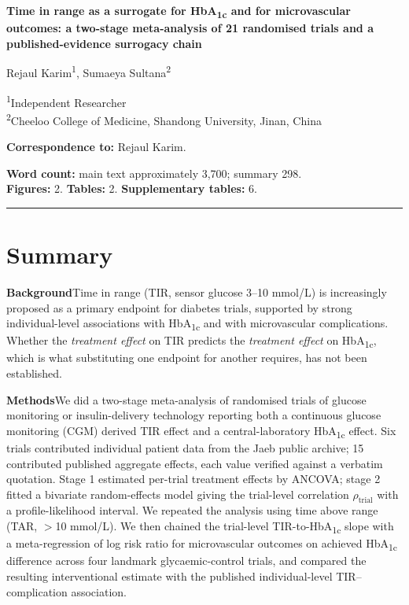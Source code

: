 \documentclass[11pt,a4paper]{article}
\begin{document}
\begin{center}
{\Large\bfseries Time in range as a surrogate for HbA\textsubscript{1c} and for microvascular
outcomes: a two-stage meta-analysis of 21 randomised trials and a published-evidence
surrogacy chain}

\vspace{1em}
{\large Rejaul Karim\textsuperscript{1}, Sumaeya Sultana\textsuperscript{2}}

\vspace{0.5em}
\begin{minipage}{0.86\textwidth}\small\raggedright
\textsuperscript{1}Independent Researcher\\
\textsuperscript{2}Cheeloo College of Medicine, Shandong University, Jinan, China

\vspace{0.6em}
\textbf{Correspondence to:} Rejaul Karim.
\end{minipage}
\end{center}

\vspace{0.5em}
\noindent\textbf{Word count:} main text approximately 3,700; summary 298.\\
\textbf{Figures:} 2. \textbf{Tables:} 2. \textbf{Supplementary tables:} 6.

\vspace{1em}
\hrule
\vspace{1em}

\section*{Summary}

\noindent\textbf{Background}\quad Time in range (TIR, sensor glucose 3--10
mmol/L) is increasingly proposed as a primary endpoint for diabetes trials, supported by strong
individual-level associations with HbA\textsubscript{1c} and with microvascular complications.
Whether the \emph{treatment effect} on TIR predicts the \emph{treatment effect} on HbA\textsubscript{1c},
which is what substituting one endpoint for another requires, has not been established.

\noindent\textbf{Methods}\quad We did a two-stage meta-analysis of randomised trials of glucose
monitoring or insulin-delivery technology reporting both a continuous glucose monitoring (CGM)
derived TIR effect and a central-laboratory HbA\textsubscript{1c} effect. Six trials contributed
individual patient data from the Jaeb public archive; 15 contributed published aggregate effects,
each value verified against a verbatim quotation. Stage 1 estimated per-trial treatment effects by
ANCOVA; stage 2 fitted a bivariate random-effects model giving the trial-level correlation
$\rho_{\mathrm{trial}}$ with a profile-likelihood interval. We repeated the analysis using time above
range (TAR, $>$10 mmol/L). We then chained the trial-level TIR-to-HbA\textsubscript{1c}
slope with a meta-regression of log risk ratio for microvascular outcomes on achieved
HbA\textsubscript{1c} difference across four landmark glycaemic-control trials, and compared the
resulting interventional estimate with the published individual-level TIR--complication association.
\end{document}
